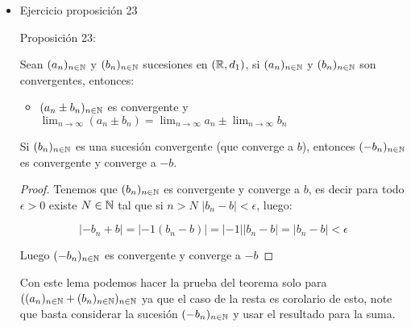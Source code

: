 \begin{itemize}[leftmargin=*]
\begin{proof}
Sea $(a_n)_{n  \in \N}$ una sucesión decreciente y acotada en $(\R,d_1)$, como $(a_n)_{n\in \N}$ es acotada entonces es acotada inferiormente y por lo tanto existe $I=\inf\{a_n: n\in \N\}$. Veamos que el $\lim_{n\to \infty}a_n=I$. Dado $\epsilon>0$ por la propiedad de aproximación existe $N\in \N$, tal que $I+\epsilon>a_N$ y como $(a_n)_{n\in \N}$ es decreciente

$$I+\epsilon>a_N\geq a_n\quad \text{si }n \geq N$$

Por otro lado $I+\epsilon>a_n>I-\epsilon$ (ya que $I=\inf\{a_n: n\in \N\}$), Así $|a_n-I|<\epsilon$ para todo $n\geq N$, luego $\lim_{n\to\infty}a_n=I$
\end{proof}

\item Ejercicio proposición 23\\

\begin{theorem}{Proposición 23:}

Sean $(a_n)_{n\in \N}$ y $(b_n)_{n\in \mathbb{N}}$ sucesiones en $(\R,d_1)$, si $(a_n)_{n\in \N}$ y $(b_n)_{n \in \mathbb{N}}$ son convergentes, entonces:

\begin{itemize}
    \item $(a_n\pm b_n)_{n\in \mathbb{N}}$ es convergente y $\lim_{n \to \infty}(a_n\pm b_n)=\lim_{n \to \infty} a_n\pm \lim_{n \to \infty} b_n $
\end{itemize}
\end{theorem}

\begin{lemma}
Si $(b_n)_{n\in \mathbb{N}}$ es una sucesión convergente (que converge a $b$), entonces $(-b_n)_{n\in \mathbb{N}}$ es convergente y converge a $-b$.
\end{lemma}

\begin{proof}
Tenemos que $(b_n)_{n\in \mathbb{N}}$ es convergente y converge a $b$, es decir para todo $\epsilon>0$ existe $N\in \N$ tal que si $n>N$ $|b_n-b|<\epsilon$, luego:

$$|-b_n+b|=|-1(b_n-b)|=|-1||b_n-b|=|b_n-b|<\epsilon$$

Luego $(-b_n)_{n\in\mathbb{N}}$ es convergente y converge a $-b$
\end{proof}

Con este lema podemos hacer la prueba del teorema solo para $((a_n)_{n\in \mathbb{N}}+(b_n)_{n\in \mathbb{N}})_{n\in \mathbb{N}}$ ya que el caso de la resta es corolario de esto, note que basta considerar la sucesión $(-b_n)_{n\in \mathbb{N}}$ y usar el resultado para la suma.\\


\end{itemize}
